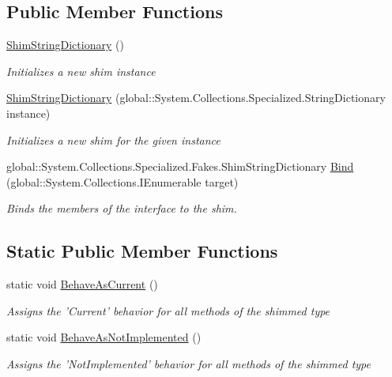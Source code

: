 \subsection*{Public Member Functions}
\begin{DoxyCompactItemize}
\item 
\hyperlink{class_system_1_1_collections_1_1_specialized_1_1_fakes_1_1_shim_string_dictionary_a72e8c926236391d9bdbf44915b9d1de6}{Shim\-String\-Dictionary} ()
\begin{DoxyCompactList}\small\item\em Initializes a new shim instance\end{DoxyCompactList}\item 
\hyperlink{class_system_1_1_collections_1_1_specialized_1_1_fakes_1_1_shim_string_dictionary_a55095d3c5369642631a1f9978dc0ce66}{Shim\-String\-Dictionary} (global\-::\-System.\-Collections.\-Specialized.\-String\-Dictionary instance)
\begin{DoxyCompactList}\small\item\em Initializes a new shim for the given instance\end{DoxyCompactList}\item 
global\-::\-System.\-Collections.\-Specialized.\-Fakes.\-Shim\-String\-Dictionary \hyperlink{class_system_1_1_collections_1_1_specialized_1_1_fakes_1_1_shim_string_dictionary_a044ebcd7e7ffd139db337aa9ae943608}{Bind} (global\-::\-System.\-Collections.\-I\-Enumerable target)
\begin{DoxyCompactList}\small\item\em Binds the members of the interface to the shim.\end{DoxyCompactList}\end{DoxyCompactItemize}
\subsection*{Static Public Member Functions}
\begin{DoxyCompactItemize}
\item 
static void \hyperlink{class_system_1_1_collections_1_1_specialized_1_1_fakes_1_1_shim_string_dictionary_af86bd1a389ddfe8cbef91b9901332274}{Behave\-As\-Current} ()
\begin{DoxyCompactList}\small\item\em Assigns the 'Current' behavior for all methods of the shimmed type\end{DoxyCompactList}\item 
static void \hyperlink{class_system_1_1_collections_1_1_specialized_1_1_fakes_1_1_shim_string_dictionary_add966c5c326a67ec192d36208a6292c4}{Behave\-As\-Not\-Implemented} ()
\begin{DoxyCompactList}\small\item\em Assigns the 'Not\-Implemented' behavior for all methods of the shimmed type\end{DoxyCompactList}\end{DoxyCompactItemize}
